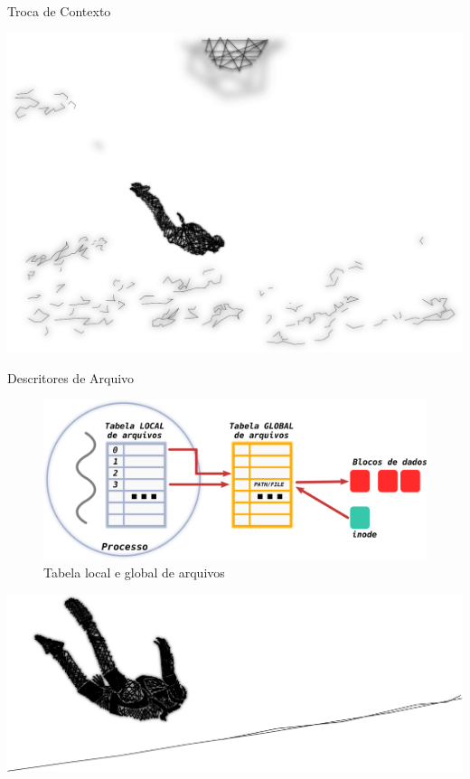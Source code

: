 \documentclass[xcolor={usenames,svgnames,dvipsnames},brazil,english,12pt,aspectratio=149]{beamer}
\begin{document}
\begin{frame}{Troca de Contexto}
\end{frame}

\begin{frame}[plain]
  \includegraphics[width=\textwidth]{presentation_sec_five}
\end{frame}

\begin{frame}{Descritores de Arquivo}
	\begin{figure}[!h]
		\centering
		\includegraphics[width=.70\textwidth]{descritores} 
		\caption{Tabela local e global de arquivos}
		\label{fig:descritores} 
	\end{figure}
\end{frame}

\begin{frame}[plain]
  \includegraphics[width=\textwidth]{presentation_sec_six}
\end{frame}
\end{document}
